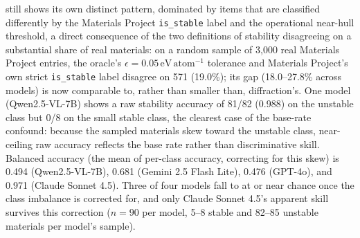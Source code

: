 \documentclass[pdflatex,sn-nature]{sn-jnl}
\begin{document}
still shows its own distinct pattern, dominated by items that are classified differently by the Materials Project \texttt{is\_stable} label
and the operational near-hull threshold, a direct
consequence of the two definitions of stability disagreeing on a substantial share of real
materials: on a random sample of 3,000 real Materials Project entries, the oracle's
$\epsilon=0.05\,\mathrm{eV\,atom^{-1}}$ tolerance and Materials Project's own strict
\texttt{is\_stable} label disagree on 571 (19.0\%); its gap (18.0--27.8\% across models) is now
comparable to, rather than smaller than, diffraction's. One model (Qwen2.5-VL-7B) shows a raw stability accuracy
of 81/82 (0.988) on the unstable class but 0/8 on the small stable class, the clearest case of the base-rate confound: because the sampled materials skew
toward the unstable class, near-ceiling raw accuracy reflects the base rate rather than
discriminative skill. Balanced accuracy (the mean of per-class accuracy, correcting for
this skew) is 0.494 (Qwen2.5-VL-7B), 0.681 (Gemini 2.5 Flash Lite), 0.476 (GPT-4o), and
0.971 (Claude Sonnet 4.5). Three of four models fall to at or near chance once the
class imbalance is corrected for, and only Claude Sonnet 4.5's apparent skill survives
this correction ($n=90$ per model, 5--8 stable and 82--85 unstable materials per model's
sample).
\end{document}
